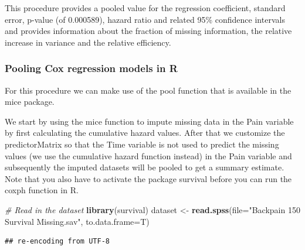 \documentclass[]{book}
\newenvironment{Shaded}{\begin{snugshade}}{\end{snugshade}}
\newcommand{\KeywordTok}[1]{\textcolor[rgb]{0.13,0.29,0.53}{\textbf{#1}}}
\newcommand{\DataTypeTok}[1]{\textcolor[rgb]{0.13,0.29,0.53}{#1}}
\newcommand{\DecValTok}[1]{\textcolor[rgb]{0.00,0.00,0.81}{#1}}
\newcommand{\StringTok}[1]{\textcolor[rgb]{0.31,0.60,0.02}{#1}}
\newcommand{\CommentTok}[1]{\textcolor[rgb]{0.56,0.35,0.01}{\textit{#1}}}
\newcommand{\OperatorTok}[1]{\textcolor[rgb]{0.81,0.36,0.00}{\textbf{#1}}}
\newcommand{\NormalTok}[1]{#1}
\begin{document}
This procedure provides a pooled value for the regression coefficient,
standard error, p-value (of 0.000589), hazard ratio and related 95\%
confidence intervals and provides information about the fraction of
missing information, the relative increase in variance and the relative
efficiency.

\subsubsection{Pooling Cox regression models in
R}\label{pooling-cox-regression-models-in-r}

For this procedure we can make use of the pool function that is
available in the mice package.

We start by using the mice function to impute missing data in the Pain
variable by first calculating the cumulative hazard values. After that
we customize the predictorMatrix so that the Time variable is not used
to predict the missing values (we use the cumulative hazard function
instead) in the Pain variable and subsequently the imputed datasets will
be pooled to get a summary estimate. Note that you also have to activate
the package survival before you can run the coxph function in R.

\begin{Shaded}
\begin{Highlighting}[]
\CommentTok{# Read in the dataset}
\KeywordTok{library}\NormalTok{(survival)}
\NormalTok{dataset <-}\StringTok{ }\KeywordTok{read.spss}\NormalTok{(}\DataTypeTok{file=}\StringTok{"Backpain 150 Survival Missing.sav"}\NormalTok{, }\DataTypeTok{to.data.frame=}\NormalTok{T)}
\end{Highlighting}
\end{Shaded}

\begin{verbatim}
## re-encoding from UTF-8
\end{verbatim}

\begin{Shaded}
\end{Shaded}
\end{document}
